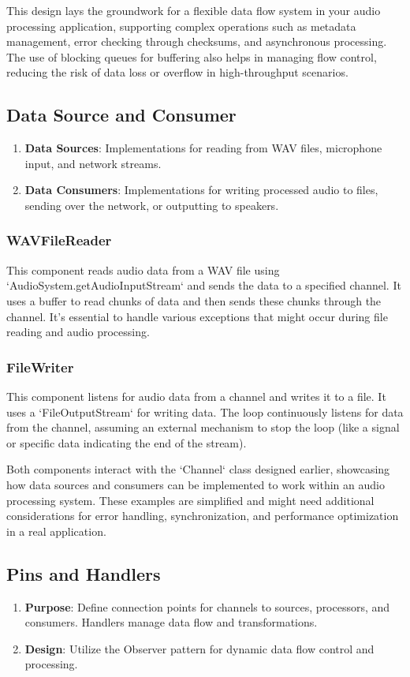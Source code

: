 \documentclass[a4paper,12pt]{article}
\begin{document}
This design lays the groundwork for a flexible data flow system in your audio processing application,
supporting complex operations such as metadata management, error checking through checksums,
and asynchronous processing. The use of blocking queues for buffering also helps in managing flow control,
reducing the risk of data loss or overflow in high-throughput scenarios.

\subsection{Data Source and Consumer}
\begin{enumerate}
  \item \textbf{Data Sources}: Implementations for reading from WAV files, microphone input, and network streams.
  \item \textbf{Data Consumers}: Implementations for writing processed audio to files, sending over the network, or outputting to speakers.
\end{enumerate}

\subsubsection*{WAVFileReader}
This component reads audio data from a WAV file using `AudioSystem.getAudioInputStream` and sends the data to a specified channel.
It uses a buffer to read chunks of data and then sends these chunks through the channel.
It's essential to handle various exceptions that might occur during file reading and audio processing.

\subsubsection*{FileWriter}
This component listens for audio data from a channel and writes it to a file.
It uses a `FileOutputStream` for writing data. The loop continuously listens for data from the channel,
assuming an external mechanism to stop the loop (like a signal or specific data indicating the end of the stream).

Both components interact with the `Channel` class designed earlier,
showcasing how data sources and consumers can be implemented to work within an audio processing system.
These examples are simplified and might need additional considerations for error handling, synchronization,
and performance optimization in a real application.

\subsection{Pins and Handlers}
\begin{enumerate}
  \item \textbf{Purpose}: Define connection points for channels to sources,
  processors, and consumers. Handlers manage data flow and transformations.
  \item \textbf{Design}: Utilize the Observer pattern for dynamic data flow control and processing.
\end{enumerate}
\end{document}
